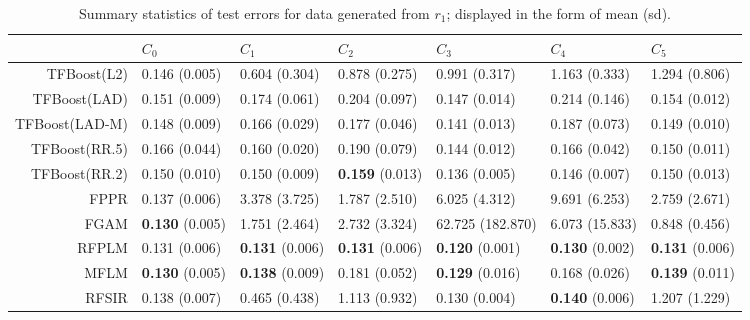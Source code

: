 \renewcommand{\arraystretch}{1.5}
\addtolength{\tabcolsep}{-3pt} 

\begin{table}[H]
\centering
\footnotesize
\begin{tabular}{rllllll}
  \hline
 & $C_0$ & $C_1$ & $C_2$ & $C_3$ & $C_4$ & $C_5$ \\ 
  \hline
TFBoost(L2) & 0.146 (0.005) & 0.604 (0.304) & 0.878 (0.275) & 0.991 (0.317) & 1.163 (0.333) & 1.294 (0.806) \\ 
  TFBoost(LAD) & 0.151 (0.009) & 0.174 (0.061) & 0.204 (0.097) & 0.147 (0.014) & 0.214 (0.146) & 0.154 (0.012) \\ 
  TFBoost(LAD-M) & 0.148 (0.009) & 0.166 (0.029) & 0.177 (0.046) & 0.141 (0.013) & 0.187 (0.073) & 0.149 (0.010) \\ 
  TFBoost(RR.5) & 0.166 (0.044) & 0.160 (0.020) & 0.190 (0.079) & 0.144 (0.012) & 0.166 (0.042) & 0.150 (0.011) \\ 
  TFBoost(RR.2) & 0.150 (0.010) & 0.150 (0.009) & \textbf{0.159} (0.013) & 0.136 (0.005) & 0.146 (0.007) & 0.150 (0.013) \\ 
  FPPR & 0.137 (0.006) & 3.378 (3.725) & 1.787 (2.510) & 6.025 (4.312) & 9.691 (6.253) & 2.759 (2.671) \\ 
  FGAM & \textbf{0.130} (0.005) & 1.751 (2.464) & 2.732 (3.324) & 62.725 (182.870) & 6.073 (15.833) & 0.848 (0.456) \\ 
  RFPLM & 0.131 (0.006) & \textbf{0.131} (0.006) & \textbf{0.131} (0.006) & \textbf{0.120} (0.001) & \textbf{0.130} (0.002) & \textbf{0.131} (0.006) \\ 
  MFLM & \textbf{0.130} (0.005) & \textbf{0.138} (0.009) & 0.181 (0.052) & \textbf{0.129} (0.016) & 0.168 (0.026) & \textbf{0.139} (0.011) \\ 
  RFSIR & 0.138 (0.007) & 0.465 (0.438) & 1.113 (0.932) & 0.130 (0.004) & \textbf{0.140} (0.006) & 1.207 (1.229) \\ 
   \hline
\end{tabular}
\caption{Summary statistics of test errors for data generated from $r_1$; displayed in the form of mean (sd).} 
\end{table}
